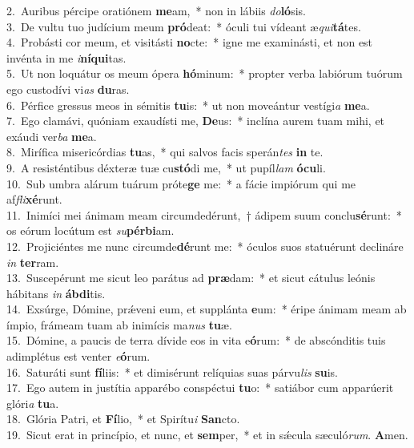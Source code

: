 {2.~}Auribus pércipe oratiónem \textbf{me}am,~* non in lábiis \textit{do}\textbf{ló}sis.\\
{3.~}De vultu tuo judícium meum \textbf{pró}deat:~* óculi tui vídeant æ\textit{qui}\textbf{tá}tes.\\
{4.~}Probásti cor meum, et visitásti \textbf{no}cte:~* igne me examinásti, et non est invénta in me \textit{i}\textbf{ní}\textbf{qui}tas.\\
{5.~}Ut non loquátur os meum ópera \textbf{hó}minum:~* propter verba labiórum tuórum ego custodívi vi\textit{as} \textbf{du}ras.\\
{6.~}Pérfice gressus meos in sémitis \textbf{tu}is:~* ut non moveántur vestígi\textit{a} \textbf{me}a.\\
{7.~}Ego clamávi, quóniam exaudísti me, \textbf{De}us:~* inclína aurem tuam mihi, et exáudi ver\textit{ba} \textbf{me}a.\\
{8.~}Mirífica misericórdias \textbf{tu}as,~* qui salvos facis sperán\textit{tes} \textbf{in} te.\\
{9.~}A resisténtibus déxteræ tuæ cu\textbf{stó}di me,~* ut pupíl\textit{lam} \textbf{ó}\textbf{cu}li.\\
{10.~}Sub umbra alárum tuárum próte\textbf{ge} me:~* a fácie impiórum qui me af\textit{fli}\textbf{xé}runt.\\
{11.~}Inimíci mei ánimam meam circumdedérunt,~† ádipem suum conclu\textbf{sé}runt:~* os eórum locútum est \textit{su}\textbf{pér}\textbf{bi}am.\\
{12.~}Projiciéntes me nunc circumde\textbf{dé}runt me:~* óculos suos statuérunt declináre \textit{in} \textbf{ter}ram.\\
{13.~}Suscepérunt me sicut leo parátus ad \textbf{præ}dam:~* et sicut cátulus leónis hábitans \textit{in} \textbf{áb}\textbf{di}tis.\\
{14.~}Exsúrge, Dómine, prǽveni eum, et supplánta \textbf{e}um:~* éripe ánimam meam ab ímpio, frámeam tuam ab inimícis ma\textit{nus} \textbf{tu}æ.\\
{15.~}Dómine, a paucis de terra dívide eos in vita e\textbf{ó}rum:~* de abscónditis tuis adimplétus est venter \textit{e}\textbf{ó}rum.\\
{16.~}Saturáti sunt \textbf{fí}liis:~* et dimisérunt relíquias suas párvu\textit{lis} \textbf{su}is.\\
{17.~}Ego autem in justítia apparébo conspéctui \textbf{tu}o:~* satiábor cum apparúerit glóri\textit{a} \textbf{tu}a.\\
{18.~}Glória Patri, et \textbf{Fí}lio,~* et Spirítu\textit{i} \textbf{San}cto.\\
{19.~}Sicut erat in princípio, et nunc, et \textbf{sem}per,~* et in sǽcula sæculó\textit{rum}. \textbf{A}men.\\
